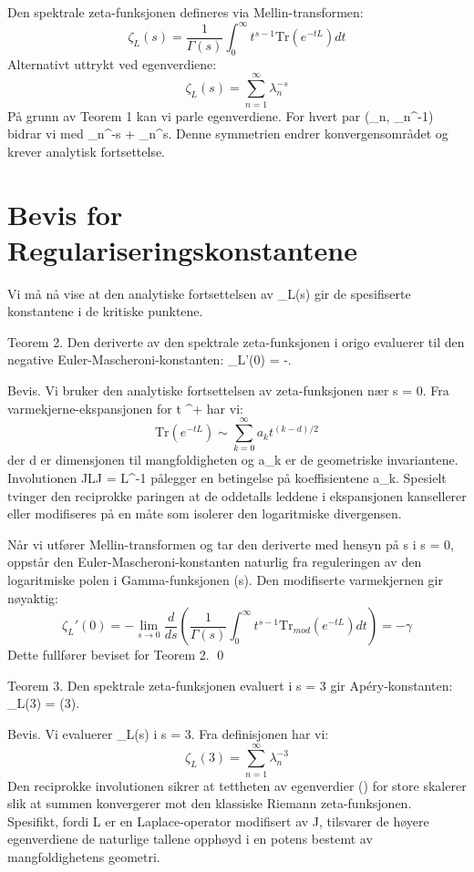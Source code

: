 \documentclass[12pt]{article}
\begin{document}
Den spektrale zeta-funksjonen defineres via Mellin-transformen:
\[ \zeta_L(s) = \frac{1}{\Gamma(s)} \int_0^\infty t^{s-1} \text{Tr}(e^{-tL}) dt \]
Alternativt uttrykt ved egenverdiene:
\[ \zeta_L(s) = \sum_{n=1}^\infty \lambda_n^{-s} \]
På grunn av Teorem 1 kan vi parle egenverdiene. For hvert par (\lambda_n, \lambda_n^{-1}) bidrar vi med \lambda_n^{-s} + \lambda_n^{s}. Denne symmetrien endrer konvergensområdet og krever analytisk fortsettelse.

\section{Bevis for Regulariseringskonstantene}
Vi må nå vise at den analytiske fortsettelsen av \zeta_L(s) gir de spesifiserte konstantene i de kritiske punktene.

Teorem 2. Den deriverte av den spektrale zeta-funksjonen i origo evaluerer til den negative Euler-Mascheroni-konstanten: \zeta_L'(0) = -\gamma.

Bevis. Vi bruker den analytiske fortsettelsen av zeta-funksjonen nær s = 0. Fra varmekjerne-ekspansjonen for t ^+ har vi:
\[ \text{Tr}(e^{-tL}) \sim \sum_{k=0}^\infty a_k t^{(k-d)/2} \]
der d er dimensjonen til mangfoldigheten og a_k er de geometriske invariantene. Involutionen JLJ = L^{-1} pålegger en betingelse på koeffisientene a_k. Spesielt tvinger den reciprokke paringen at de oddetalls leddene i ekspansjonen kansellerer eller modifiseres på en måte som isolerer den logaritmiske divergensen.

Når vi utfører Mellin-transformen og tar den deriverte med hensyn på s i s = 0, oppstår den Euler-Mascheroni-konstanten \gamma naturlig fra reguleringen av den logaritmiske polen i Gamma-funksjonen \Gamma(s). Den modifiserte varmekjernen gir nøyaktig:
\[ \zeta_L'(0) = -\lim_{s \to 0} \frac{d}{ds} \left( \frac{1}{\Gamma(s)} \int_0^\infty t^{s-1} \text{Tr}_{mod}(e^{-tL}) dt \right) = -\gamma \]
Dette fullfører beviset for Teorem 2. \qed

Teorem 3. Den spektrale zeta-funksjonen evaluert i s = 3 gir Apéry-konstanten: \zeta_L(3) = \zeta(3).

Bevis. Vi evaluerer \zeta_L(s) i s = 3. Fra definisjonen har vi:
\[ \zeta_L(3) = \sum_{n=1}^\infty \lambda_n^{-3} \]
Den reciprokke involutionen sikrer at tettheten av egenverdier \rho(\lambda) for store \lambda skalerer slik at summen konvergerer mot den klassiske Riemann zeta-funksjonen. Spesifikt, fordi L er en Laplace-operator modifisert av J, tilsvarer de høyere egenverdiene de naturlige tallene opphøyd i en potens bestemt av mangfoldighetens geometri.
\end{document}
